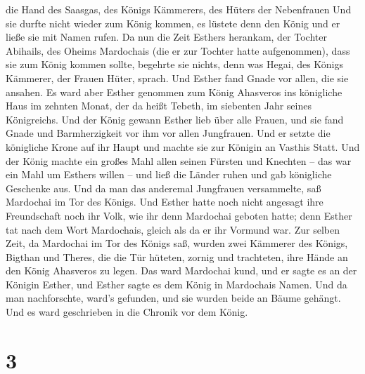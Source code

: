 die Hand des Saasgas, des Königs Kämmerers, des Hüters der Nebenfrauen
Und sie durfte nicht wieder zum König kommen, es lüstete denn den König
und er ließe sie mit Namen rufen.  Da nun die Zeit
Esthers herankam, der Tochter Abihails, des Oheims Mardochais (die er
zur Tochter hatte aufgenommen), dass sie zum König kommen sollte,
begehrte sie nichts, denn was Hegai, des Königs Kämmerer, der Frauen
Hüter, sprach. Und Esther fand Gnade vor allen, die sie ansahen.
 Es ward aber Esther genommen zum König Ahasveros ins
königliche Haus im zehnten Monat, der da heißt Tebeth, im siebenten Jahr
seines Königreichs.  Und der König gewann Esther lieb
über alle Frauen, und sie fand Gnade und Barmherzigkeit vor ihm vor
allen Jungfrauen. Und er setzte die königliche Krone auf ihr Haupt und
machte sie zur Königin an Vasthis Statt.  Und der König
machte ein großes Mahl allen seinen Fürsten und Knechten -- das war ein
Mahl um Esthers willen -- und ließ die Länder ruhen und gab königliche
Geschenke aus.  Und da man das anderemal Jungfrauen
versammelte, saß Mardochai im Tor des Königs.  Und Esther
hatte noch nicht angesagt ihre Freundschaft noch ihr Volk, wie ihr denn
Mardochai geboten hatte; denn Esther tat nach dem Wort Mardochais,
gleich als da er ihr Vormund war.  Zur selben Zeit, da
Mardochai im Tor des Königs saß, wurden zwei Kämmerer des Königs,
Bigthan und Theres, die die Tür hüteten, zornig und trachteten, ihre
Hände an den König Ahasveros zu legen.  Das ward
Mardochai kund, und er sagte es an der Königin Esther, und Esther sagte
es dem König in Mardochais Namen.  Und da man
nachforschte, ward's gefunden, und sie wurden beide an Bäume gehängt.
Und es ward geschrieben in die Chronik vor dem König.

\hypertarget{section-2}{%
\section{3}\label{section-2}}

